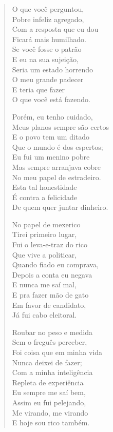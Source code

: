\begin{verse}
O que você perguntou,\\
Pobre infeliz agregado,\\
Com a resposta que eu dou\\
Ficará mais humilhado.\\
Se você fosse o patrão\\
E eu na sua sujeição,\\
Seria um estado horrendo\\
O meu grande padecer\\
E teria que fazer\\
O que você está fazendo.

Porém, eu tenho cuidado,\\
Meus planos sempre são certos\\
E o povo tem um ditado\\
Que o mundo é dos espertos;\\
Eu fui um menino pobre\\
Mas sempre arranjava cobre\\
No meu papel de estradeiro.\\
Esta tal honestidade\\
É contra a felicidade\\
De quem quer juntar dinheiro.

No papel de mexerico\\
Tirei primeiro lugar,\\
Fui o leva-e-traz do rico\\
Que vive a politicar,\\
Quando fiado eu comprava,\\
Depois a conta eu negava\\
E nunca me saí mal,\\
E pra fazer mão de gato\\
Em favor de candidato,\\
Já fui cabo eleitoral.

Roubar no peso e medida\\
Sem o freguês perceber,\\
Foi coisa que em minha vida\\
Nunca deixei de fazer;\\
Com a minha inteligência\\
Repleta de experiência\\
Eu sempre me saí bem,\\
Assim eu fui pelejando,\\
Me virando, me virando\\
E hoje sou rico também.


\end{verse}
